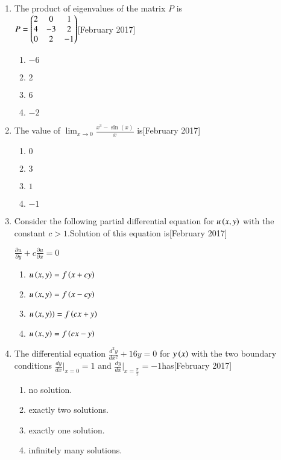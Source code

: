 \documentclass[journal]{IEEEtran}
\begin{document}
\begin{enumerate}
\item The product of eigenvalues of the matrix $P$ is \\
$P = \begin{pmatrix}2 & 0 & 1 \\ 4 & -3 & 2 \\ 0 & 2 & -1\end{pmatrix} $\hfill[February 2017]
\begin{enumerate}
    \item $-6$
    \item $2$
    \item $6$
    \item $-2$
\end{enumerate}
\item The value of $ \lim_{x \to 0} \frac{x^3 - \sin(x)}{x} $ is\hfill[February 2017]
\begin{enumerate}
    \item $0$
    \item $3$
    \item $1$
    \item $-1$
\end{enumerate}
\item Consider the following partial differential equation for  $u\left(x, y\right)$ with the \\ constant $c > 1$.Solution of this equation is\hfill[February 2017]
\begin{center}
$\frac{\partial u}{\partial y} + c \frac{\partial u}{\partial x} = 0$
\end{center}
\begin{enumerate}
    \item$ u\left(x, y\right)= f\left(x + cy\right)$
    \item$ u\left(x, y\right) = f\left(x - cy\right) $
    \item$ u\left(x, y\right)) = f\left(cx + y\right) $
    \item$ u\left(x, y\right) = f\left(cx - y\right) $
\end{enumerate}
\item The differential equation $ \frac{d^2 y}{dx^2} + 16y = 0 $ for $y\left(x\right)$ with the two boundary conditions $\frac{dy}{dx}|_{x=0} = 1 $ and $\frac{dy}{dx}|_{x=\frac{\pi}{2}} = -1 $has\hfill[February 2017]
\begin{enumerate}
    \item no solution.
    \item exactly two solutions.
    \item exactly one solution.
    \item infinitely many solutions.
\end{enumerate}

\end{enumerate}
\end{document}
